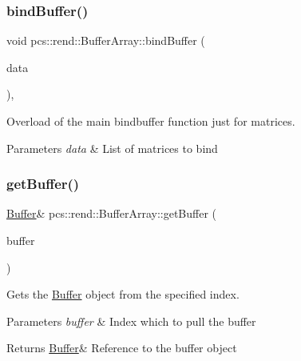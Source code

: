 \subsubsection{\texorpdfstring{bind\+Buffer()}{bindBuffer()}\hspace{0.1cm}{\footnotesize\ttfamily [2/2]}}
{\footnotesize\ttfamily void pcs\+::rend\+::\+Buffer\+Array\+::bind\+Buffer (\begin{DoxyParamCaption}\item[{const std\+::vector$<$ \hyperlink{structpcs_1_1Mat4f}{Mat4f} $>$ \&}]{data }\end{DoxyParamCaption})\hspace{0.3cm}{\ttfamily [inline]}, {\ttfamily [protected]}}



Overload of the main bindbuffer function just for matrices. 


\begin{DoxyParams}{Parameters}
{\em data} & List of matrices to bind \\
\hline
\end{DoxyParams}
\mbox{\label{classpcs_1_1rend_1_1BufferArray_ad4b43fddb8e19fcaa6fbb8ff80a64a94}} 
\subsubsection{\texorpdfstring{get\+Buffer()}{getBuffer()}}
{\footnotesize\ttfamily \hyperlink{classpcs_1_1rend_1_1Buffer}{Buffer}\& pcs\+::rend\+::\+Buffer\+Array\+::get\+Buffer (\begin{DoxyParamCaption}\item[{\hyperlink{namespacepcs_1_1rend_a731e43a479c7b7b61dd23586494ee61b}{Buffer\+Index}}]{buffer }\end{DoxyParamCaption})\hspace{0.3cm}{\ttfamily [inline]}}



Gets the \hyperlink{classpcs_1_1rend_1_1Buffer}{Buffer} object from the specified index. 


\begin{DoxyParams}{Parameters}
{\em buffer} & Index which to pull the buffer \\
\hline
\end{DoxyParams}
\begin{DoxyReturn}{Returns}
\hyperlink{classpcs_1_1rend_1_1Buffer}{Buffer}\& Reference to the buffer object 
\end{DoxyReturn}
\mbox{\label{classpcs_1_1rend_1_1BufferArray_a7ed1705d18349b1e7a08b769f233546a}} 
